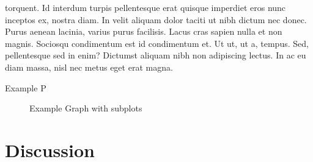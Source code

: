 \documentclass[
  12pt,
]{article}
\begin{document}
torquent. Id interdum turpis pellentesque erat quisque imperdiet eros nunc inceptos ex, nostra diam. In velit aliquam dolor taciti ut nibh dictum nec donec. Purus aenean lacinia, varius purus facilisis. Lacus cras sapien nulla et non magnis. Sociosqu condimentum est id condimentum et. Ut ut, ut a, tempus. Sed, pellentesque sed in enim? Dictumst aliquam nibh non adipiscing lectus. In ac eu diam massa, nisl nec metus eget erat magna.

Example P

\begin{figure}[H]

{\centering {}

}

\caption{Example Graph with subplots}\label{fig:unnamed-chunk-12}
\end{figure}

\hypertarget{discussion}{%
\section{Discussion}\label{discussion}}
\end{document}
